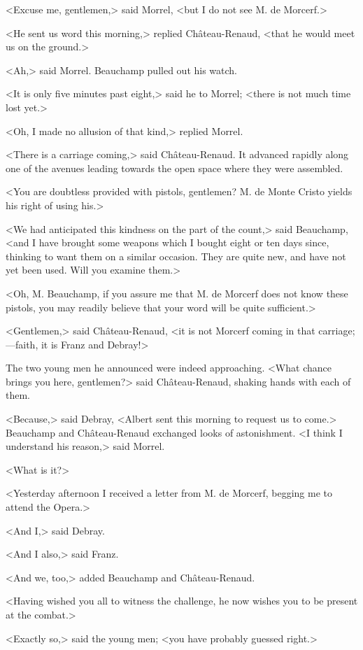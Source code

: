 <Excuse me, gentlemen,> said Morrel, <but I do not see M. de Morcerf.> 

 <He sent us word this morning,> replied Château-Renaud, <that he would meet us on the ground.> 

 <Ah,> said Morrel. Beauchamp pulled out his watch. 

 <It is only five minutes past eight,> said he to Morrel; <there is not much time lost yet.> 

 <Oh, I made no allusion of that kind,> replied Morrel. 

 <There is a carriage coming,> said Château-Renaud. It advanced rapidly along one of the avenues leading towards the open space where they were assembled. 

 <You are doubtless provided with pistols, gentlemen? M. de Monte Cristo yields his right of using his.> 

 <We had anticipated this kindness on the part of the count,> said Beauchamp, <and I have brought some weapons which I bought eight or ten days since, thinking to want them on a similar occasion. They are quite new, and have not yet been used. Will you examine them.> 

 <Oh, M. Beauchamp, if you assure me that M. de Morcerf does not know these pistols, you may readily believe that your word will be quite sufficient.> 

 <Gentlemen,> said Château-Renaud, <it is not Morcerf coming in that carriage;—faith, it is Franz and Debray!> 

 The two young men he announced were indeed approaching. <What chance brings you here, gentlemen?> said Château-Renaud, shaking hands with each of them. 

 <Because,> said Debray, <Albert sent this morning to request us to come.> Beauchamp and Château-Renaud exchanged looks of astonishment. <I think I understand his reason,> said Morrel. 

 <What is it?> 

 <Yesterday afternoon I received a letter from M. de Morcerf, begging me to attend the Opera.> 

 <And I,> said Debray. 

 <And I also,> said Franz. 

 <And we, too,> added Beauchamp and Château-Renaud. 

 <Having wished you all to witness the challenge, he now wishes you to be present at the combat.> 

 <Exactly so,> said the young men; <you have probably guessed right.> 

